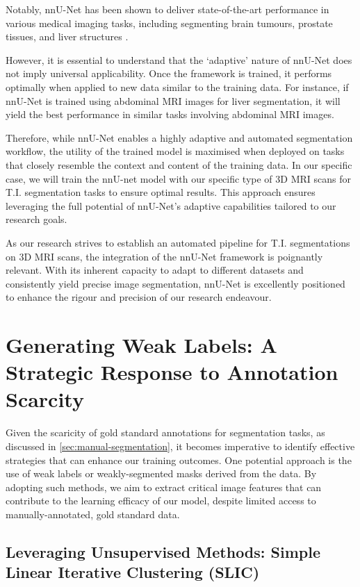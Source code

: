 Notably, nnU-Net has been shown to deliver state-of-the-art performance in various medical imaging tasks, including segmenting brain tumours, prostate tissues, and liver structures \cite{isensee2019nnu}.

However, it is essential to understand that the `adaptive' nature of nnU-Net does not imply universal applicability. Once the framework is trained, it performs optimally when applied to new data similar to the training data. For instance, if nnU-Net is trained using abdominal MRI images for liver segmentation, it will yield the best performance in similar tasks involving abdominal MRI images.

Therefore, while nnU-Net enables a highly adaptive and automated segmentation workflow, the utility of the trained model is maximised when deployed on tasks that closely resemble the context and content of the training data. In our specific case, we will train the nnU-net model with our specific type of 3D MRI scans for T.I. segmentation tasks to ensure optimal results. This approach ensures leveraging the full potential of nnU-Net's adaptive capabilities tailored to our research goals.

As our research strives to establish an automated pipeline for T.I. segmentations on 3D MRI scans, the integration of the nnU-Net framework is poignantly relevant. With its inherent capacity to adapt to different datasets and consistently yield precise image segmentation, nnU-Net is excellently positioned to enhance the rigour and precision of our research endeavour.

\section{Generating Weak Labels: A Strategic Response to Annotation Scarcity}

Given the scaricity of gold standard annotations for segmentation tasks, as discussed in \autoref{sec:manual-segmentation}, it becomes imperative to identify effective strategies that can enhance our training outcomes. One potential approach is the use of weak labels or weakly-segmented masks derived from the data. By adopting such methods, we aim to extract critical image features that can contribute to the learning efficacy of our model, despite limited access to manually-annotated, gold standard data.

\subsection{Leveraging Unsupervised Methods: Simple Linear Iterative Clustering (SLIC)}

